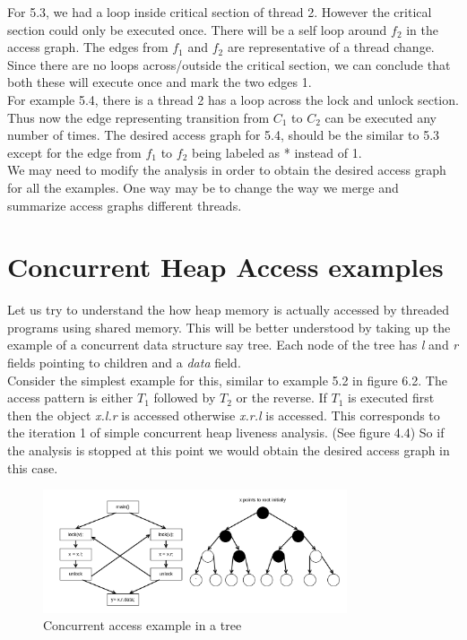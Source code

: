For 5.3, we had a loop inside critical section of thread 2. However the critical section could only be executed once. There will be a self loop around $f_2$ in the access graph. The edges from $f_1$ and $f_2$ are representative of a thread change. Since there are no loops across/outside the critical section, we can conclude that both these will execute once and mark the two edges 1. \\

For example 5.4, there is a thread 2 has a loop across the lock and unlock section. Thus now the edge representing transition from $C_1$ to $C_2$ can be executed any number of times. The desired access graph for 5.4, should be the similar to 5.3 except for the edge from $f_1$ to $f_2$ being labeled as * instead of 1. \\

We may need to modify the analysis in order to obtain the desired access graph for all the examples. One way may be to change the way we merge and summarize access graphs different threads.

\section{Concurrent Heap Access examples}

Let us try to understand the how heap memory is actually accessed by threaded programs using shared memory. This will be better understood by taking up the example of a concurrent data structure say tree. Each node of the tree has \emph{l} and \emph{r} fields pointing to children and a \emph{data} field. \\

Consider the simplest example for this, similar to example 5.2 in figure 6.2. The access pattern is either $T_1$ followed by $T_2$ or the reverse. If $T_1$ is executed first then the object \emph{x.l.r} is accessed otherwise \emph{x.r.l} is accessed. This corresponds to the iteration 1 of simple concurrent heap liveness analysis. (See figure 4.4) So if the analysis is stopped at this point we would obtain the desired access graph in this case. \\

\begin{figure}
	\centering
	\includegraphics[width=0.8\textwidth]{Figures/tree1.png}
	\caption{Concurrent access example in a tree}
	\label{fig:ch5example}
\end{figure}  

